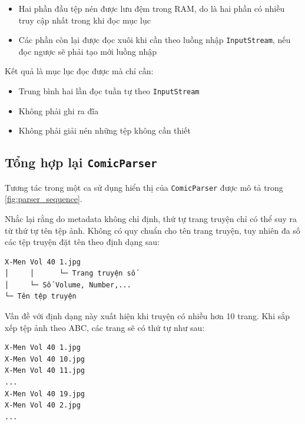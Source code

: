 \documentclass[../../../../thesis]{subfiles}
\begin{document}
\begin{itemize}
    \item
        Hai phần đầu tệp nén được lưu đệm trong RAM, do là hai phần có nhiều
        truy cập nhất trong khi đọc mục lục
    \item
        Các phần còn lại được đọc xuôi khi cần theo luồng nhập
        \texttt{InputStream}, nếu đọc ngược sẽ phải tạo mới luồng nhập
\end{itemize}

Kết quả là mục lục đọc được mà chỉ cần:

\begin{itemize}
    \item
        Trung bình hai lần đọc tuần tự theo \texttt{InputStream}
    \item
        Không phải ghi ra đĩa
    \item
        Không phải giải nén những tệp không cần thiết
\end{itemize}



\subsection{Tổng hợp lại \texttt{ComicParser}}

Tương tác trong một ca sử dụng hiển thị của \texttt{ComicParser} được mô tả
trong \autoref{fig:parser_sequence}.

Nhắc lại rằng do metadata không chỉ định, thứ tự trang truyện chỉ có thể suy ra
từ thứ tự tên tệp ảnh. Không có quy chuẩn cho tên trang truyện, tuy nhiên đa số
các tệp truyện đặt tên theo định dạng sau:

\begin{verbatim}
X-Men Vol 40 1.jpg
│     │      └─ Trang truyện số
│     └─ Số Volume, Number,...
└─ Tên tệp truyện
\end{verbatim}

Vấn đề với định dạng này xuất hiện khi truyện có nhiều hơn 10 trang. Khi sắp xếp
tệp ảnh theo ABC, các trang sẽ có thứ tự như sau:

\begin{verbatim}
X-Men Vol 40 1.jpg
X-Men Vol 40 10.jpg
X-Men Vol 40 11.jpg
...
X-Men Vol 40 19.jpg
X-Men Vol 40 2.jpg
...
\end{verbatim}
\end{document}
